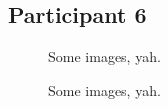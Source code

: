 \lipsum[1]


\subsection{Participant 6}

\clearpage

\begin{figure}[h]
	\caption{Some images, yah.}
\end{figure}

\lipsum[1]

\clearpage

\begin{figure}[h]
	\caption{Some images, yah.}
\end{figure}

